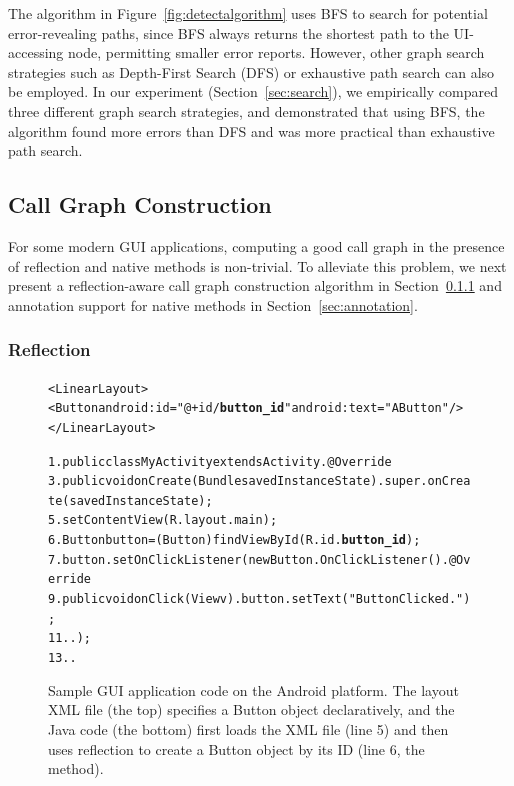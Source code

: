 The algorithm in Figure~\ref{fig:detectalgorithm} uses BFS to search
for potential error-revealing paths, since BFS always returns the
shortest path to the UI-accessing node, permitting
smaller error reports. However,
other graph search strategies such as Depth-First Search (DFS) or
exhaustive path search can also be employed. In our experiment (Section~\ref{sec:search}),
we empirically compared three different graph search strategies, and demonstrated that
using BFS, the algorithm found more errors than DFS and was more practical than
exhaustive path search.

\tinystep

\subsection{Call Graph Construction}
\label{sec:cgcon}

For some modern GUI applications, computing a good
call graph in the presence of reflection and native methods is non-trivial. 
To alleviate this problem, we next present a reflection-aware call graph
construction algorithm in Section~\ref{sec:cg} and annotation support
for native methods in Section~\ref{sec:annotation}.

\subsubsection{Reflection}
\label{sec:cg}

% 

\begin{figure}[t]
\begin{CodeOut}
\begin{alltt}
<LinearLayout>
    <Button android:id="@+id/\textbf{button\_id}" android:text="A Button" />
</LinearLayout>

1. public class MyActivity extends Activity .    @Override
3.    public void onCreate(Bundle savedInstanceState) .        super.onCreate(savedInstanceState);
5.        setContentView(R.layout.main);
6.        Button button = (Button) findViewById(R.id.\textbf{button\_id});
7.        button.setOnClickListener(new Button.OnClickListener() .            @Override
9.            public void onClick(View v) .               button.setText("Button Clicked.");
11.           .       \ttrcb);
13.   . \ttrcb
\end{alltt}
\end{CodeOut}
\vspace*{-3.0ex} \caption{Sample GUI application code on the Android platform. The layout
XML file (the top) specifies a Button object declaratively, 
and the Java code (the bottom)
first loads the XML file (line 5) and then uses reflection to create
a Button object by its ID (line 6, the  method).}
\label{fig:sampleandroid}
\end{figure}



